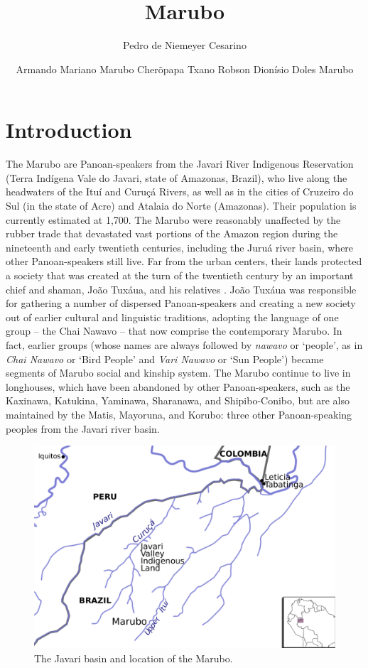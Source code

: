 \documentclass[output=paper,
modfonts,nonflat
]{langsci/langscibook}
\author{Pedro de Niemeyer Cesarino\affiliation{University of São Paulo, Brazil}%
\and Armando Mariano Marubo Cherõpapa Txano%
\lastand Robson Dionísio Doles Marubo%
}%
\title{Marubo}
\begin{document}
\section{Introduction}

The Marubo are Panoan-speakers from the Javari River Indigenous Reservation (Terra Indígena Vale do Javari, state of Amazonas, Brazil), who live along the headwaters of the Ituí and Curuçá Rivers, as well as in the cities of Cruzeiro do Sul (in the state of Acre) and Atalaia do Norte (Amazonas). Their population is currently estimated at 1,700. The Marubo were reasonably unaffected by the rubber trade that devastated vast portions of the Amazon region during the nineteenth and early twentieth centuries, including the Juruá river basin, where other Panoan-speakers still live. Far from the urban centers, their lands protected a society that was created at the turn of the twentieth century by an important chief and shaman, João Tuxáua, and his relatives \citep{Ruedas2001,Welper2009}. João Tuxáua was responsible for gathering a number of dispersed Panoan-speakers and creating a new society out of earlier cultural and linguistic traditions, adopting the language of one group -- the Chai Nawavo -- that now comprise the contemporary Marubo. In fact, earlier groups (whose names are always followed by \textit{nawavo} or `people', as in \textit{Chai Nawavo} or `Bird People' and \textit{Vari Nawavo} or `Sun People') became segments of Marubo social and kinship system. The Marubo continue to live in longhouses, which have been abandoned by other Panoan-speakers, such as the Kaxinawa, Katukina, Yaminawa, Sharanawa, and Shipibo-Conibo, but are also maintained by the Matis, Mayoruna, and Korubo: three other Panoan-speaking peoples from the Javari river basin.

\begin{figure}[H]
\includegraphics[width=\textwidth]{figures/marubo.pdf}
  \caption{The Javari basin and location of the Marubo.}
\end{figure}
\end{document}
